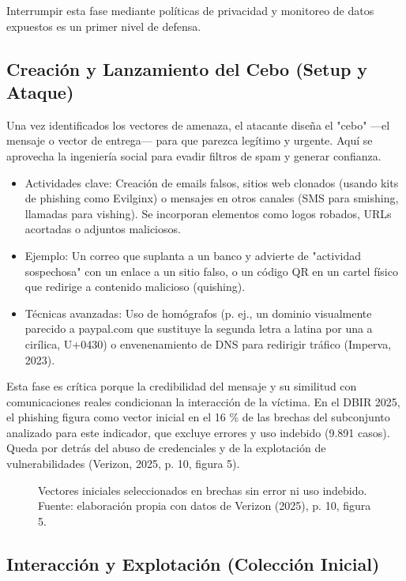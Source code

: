 \documentclass[11pt,a4paper,oneside]{report}
\begin{document}
Interrumpir esta fase mediante políticas de privacidad y monitoreo de datos expuestos es un primer nivel de defensa.

\subsection{Creación y Lanzamiento del Cebo (Setup y Ataque)}

Una vez identificados los vectores de amenaza, el atacante diseña el "cebo" ---el mensaje o vector de entrega--- para que parezca legítimo y urgente. Aquí se aprovecha la ingeniería social para evadir filtros de spam y generar confianza.

\begin{itemize}
  \item Actividades clave: Creación de emails falsos, sitios web clonados (usando kits de phishing como Evilginx) o mensajes en otros canales (SMS para smishing, llamadas para vishing). Se incorporan elementos como logos robados, URLs acortadas o adjuntos maliciosos.
  \item Ejemplo: Un correo que suplanta a un banco y advierte de "actividad sospechosa" con un enlace a un sitio falso, o un código QR en un cartel físico que redirige a contenido malicioso (quishing).
  \item Técnicas avanzadas: Uso de homógrafos (p. ej., un dominio visualmente parecido a paypal.com que sustituye la segunda letra a latina por una a cirílica, U+0430) o envenenamiento de DNS para redirigir tráfico (Imperva, 2023).
\end{itemize}

Esta fase es crítica porque la credibilidad del mensaje y su similitud con comunicaciones reales condicionan la interacción de la víctima. En el DBIR 2025, el phishing figura como vector inicial en el 16 \% de las brechas del subconjunto analizado para este indicador, que excluye errores y uso indebido (9.891 casos). Queda por detrás del abuso de credenciales y de la explotación de vulnerabilidades (Verizon, 2025, p. 10, figura 5).

\begin{figure}[H]
  \centering
  
  \caption[Vectores iniciales seleccionados del DBIR 2025 (n=9.891).]{Vectores iniciales seleccionados en brechas sin error ni uso indebido. Fuente: elaboración propia con datos de Verizon (2025), p. 10, figura 5.}
  \label{fig:2-2}
\end{figure}

\subsection{Interacción y Explotación (Colección Inicial)}
\end{document}
